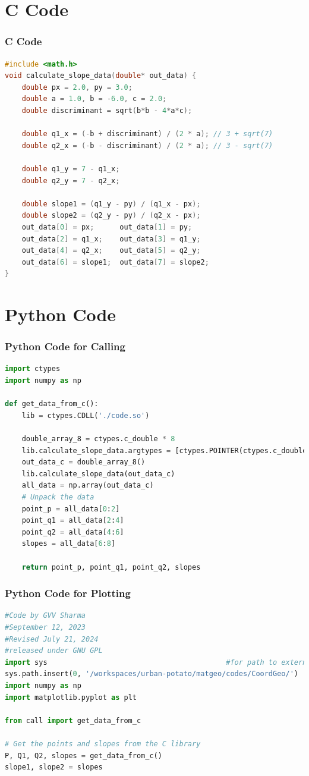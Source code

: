 \documentclass{beamer}
\theoremstyle{remark}
\numberwithin{equation}{section}
\begin{document}
\section{C Code}
\begin{frame}[fragile]
\frametitle{C Code}
\begin{lstlisting}[language=C]
#include <math.h>
void calculate_slope_data(double* out_data) {
    double px = 2.0, py = 3.0;
    double a = 1.0, b = -6.0, c = 2.0;
    double discriminant = sqrt(b*b - 4*a*c);
    
    double q1_x = (-b + discriminant) / (2 * a); // 3 + sqrt(7)
    double q2_x = (-b - discriminant) / (2 * a); // 3 - sqrt(7)

    double q1_y = 7 - q1_x;  
    double q2_y = 7 - q2_x;  
    
    double slope1 = (q1_y - py) / (q1_x - px);
    double slope2 = (q2_y - py) / (q2_x - px);
    out_data[0] = px;      out_data[1] = py;
    out_data[2] = q1_x;    out_data[3] = q1_y;
    out_data[4] = q2_x;    out_data[5] = q2_y;
    out_data[6] = slope1;  out_data[7] = slope2;
}
    \end{lstlisting}
\end{frame}
\section{Python Code}
\begin{frame}[fragile]
\frametitle{Python Code for Calling}
\begin{lstlisting}[language=Python]
import ctypes
import numpy as np

def get_data_from_c():
    lib = ctypes.CDLL('./code.so')
    
    double_array_8 = ctypes.c_double * 8
    lib.calculate_slope_data.argtypes = [ctypes.POINTER(ctypes.c_double)]
    out_data_c = double_array_8()
    lib.calculate_slope_data(out_data_c)
    all_data = np.array(out_data_c)
    # Unpack the data
    point_p = all_data[0:2]
    point_q1 = all_data[2:4]
    point_q2 = all_data[4:6]
    slopes = all_data[6:8]
    
    return point_p, point_q1, point_q2, slopes
\end{lstlisting}
\end{frame}
\begin{frame}[fragile]
\frametitle{Python Code for Plotting}
\begin{lstlisting}[language=Python]
#Code by GVV Sharma
#September 12, 2023
#Revised July 21, 2024
#released under GNU GPL
import sys                                          #for path to external scripts
sys.path.insert(0, '/workspaces/urban-potato/matgeo/codes/CoordGeo/') 
import numpy as np
import matplotlib.pyplot as plt

from call import get_data_from_c

# Get the points and slopes from the C library
P, Q1, Q2, slopes = get_data_from_c()
slope1, slope2 = slopes
\end{lstlisting}
\end{frame}
\end{document}
